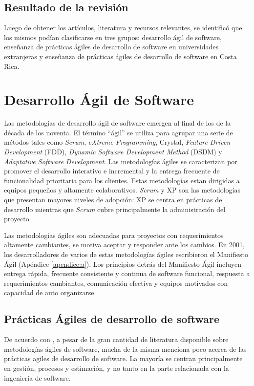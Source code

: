 \documentclass[journal]{IEEEtran}
\begin{document}
\subsection{Resultado de la revisión} \label{sec:resultado-rev-lit}
Luego de obtener los artículos, literatura y recursos relevantes, se identificó que los mismos podían clasificarse en tres grupos: desarrollo ágil de software, enseñanza de prácticas ágiles de desarrollo de software en universidades extranjeras y enseñanza de prácticas ágiles de desarrollo de software en Costa Rica.



\section{Desarrollo Ágil de Software} \label{sec:desarrollo-agil}
Las metodologías de desarrollo ágil de software emergen al final de los de la década de los noventa. El término ``ágil'' se utiliza para agrupar una serie de métodos tales como \emph{Scrum}, \emph{eXtreme Programming}, Crystal, \emph{Feature Driven Development} (FDD), \emph{Dynamic Software Development Method} (DSDM) y \emph{Adaptative Software Development}\cite{rashina-et-al}. Las metodologías ágiles se caracterizan por promover el desarrollo interativo e incremental y la entrega frecuente de funcionalidad prioritaria para los clientes. Estas metodologías estan dirigidas a equipos pequeños y altamente colaborativos. \emph{Scrum} y XP son las metodologías que presentan mayores niveles de adopción\cite{version-one}: XP se centra en prácticas de desarrollo mientras que \emph{Scrum} cubre principalmente la administración del proyecto.

Las metodologías ágiles son adecuadas para proyectos con requerimientos altamente cambiantes, se motiva aceptar y responder ante los cambios. En 2001, los desarrolladores de varios de estas metodologías ágiles escribieron el Manifiesto Ágil \cite{agile-manifesto} (Apéndice \ref{apendice:a}). Los principios detrás del Manifiesto Ágil incluyen entrega rápida, frecuente consistente y continua de software funcional, respuesta a requerimientos cambiantes, comunicación efectiva y equipos motivados con capacidad de auto organizarse.

\subsection{Prácticas Ágiles de desarrollo de software} \label{sec:practicas-agiles-desarrollo}
De acuerdo con \cite{ford}, a pesar de la gran cantidad de literatura disponible sobre metodologías ágiles de software, mucha de la misma menciona poco acerca de las prácticas agiles de desarrollo de software. La mayoría se centran principalmente en gestión, procesos y estimación, y no tanto en la parte relacionada con la ingeniería de software.
\end{document}
